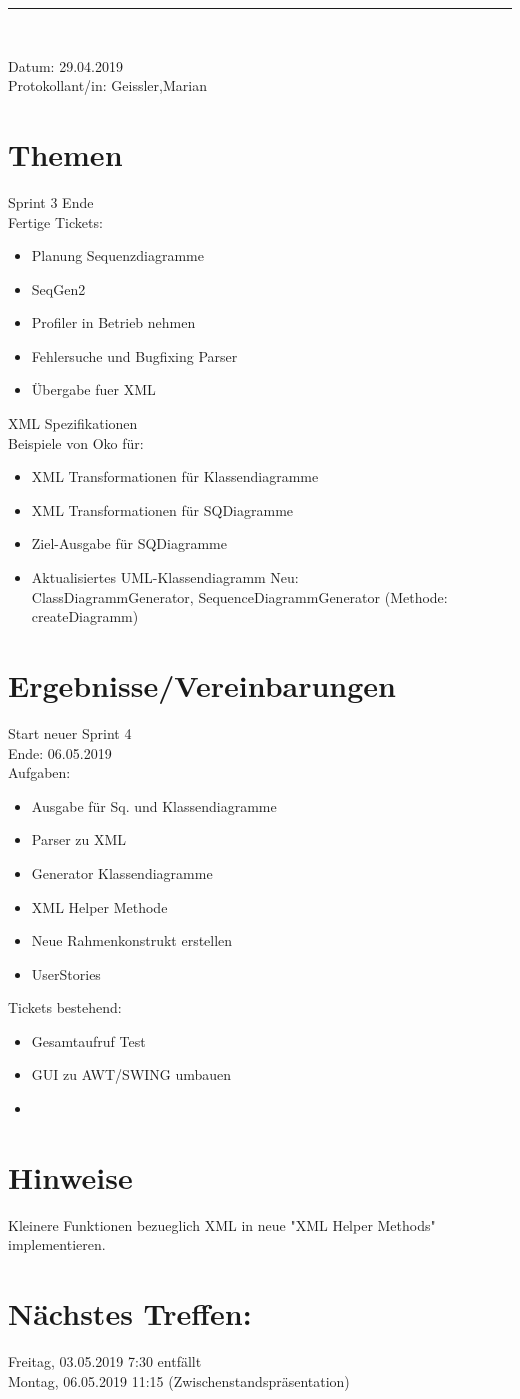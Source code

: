 \begin{center}  
\vspace{0.5pt}\nointerlineskip\rule{\textwidth}{0.2pt}\\ 
\vspace{0.5pt}\nointerlineskip
\end{center} 
\large Datum: 29.04.2019\vspace{3pt}\\\large Protokollant/in: Geissler,Marian
\section{Themen}
Sprint 3 Ende \\
Fertige Tickets: 
\begin{itemize}
\item Planung Sequenzdiagramme
\item SeqGen2 
\item Profiler in Betrieb nehmen
\item Fehlersuche und Bugfixing Parser
\item Übergabe fuer XML
\end{itemize}
XML Spezifikationen \\
Beispiele von Oko für: 
\begin{itemize}
\item XML Transformationen für Klassendiagramme
\item XML Transformationen für SQDiagramme
\item Ziel-Ausgabe für SQDiagramme
\item Aktualisiertes UML-Klassendiagramm
Neu: \\
ClassDiagrammGenerator, SequenceDiagrammGenerator (Methode: createDiagramm)
\end{itemize} 
\section{Ergebnisse/Vereinbarungen}
Start neuer Sprint 4 \\
Ende: 06.05.2019\\
Aufgaben:
\begin{itemize}
\item Ausgabe für Sq. und Klassendiagramme
\item Parser zu XML
\item Generator Klassendiagramme
\item XML Helper Methode
\item Neue Rahmenkonstrukt erstellen
\item UserStories
\end{itemize} 
Tickets bestehend:
\begin{itemize}
\item Gesamtaufruf Test
\item GUI zu AWT/SWING umbauen
\item 
\end{itemize} 
\section{Hinweise}
Kleinere Funktionen bezueglich XML in neue "XML Helper Methods" implementieren. 
\section*{Nächstes Treffen:}
Freitag, 03.05.2019 7:30 entfällt\\
Montag, 06.05.2019 11:15 (Zwischenstandspräsentation)
